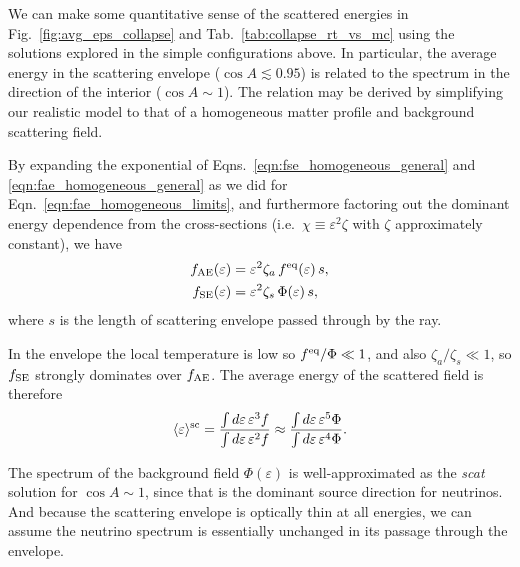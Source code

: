 \documentclass[aps,floatfix,prd,superscriptaddress,twocolumn]{revtex4-1}
\newcommand{\todo}[1]{\marginpar{\tiny{\textcolor{red}{#1}}}}
\renewcommand\todo[1]{} %
\begin{document}
We can make some quantitative sense of the scattered energies in
Fig.~\ref{fig:avg_eps_collapse} and Tab.~\ref{tab:collapse_rt_vs_mc}
using the solutions explored in the simple configurations above.
In particular, the average energy in the scattering envelope
($\cos A\lesssim 0.95$) is related to the spectrum in the direction
of the interior ($\cos A \sim 1$).
The relation may be derived by simplifying our realistic model
to that of a homogeneous matter profile and background scattering field.

By expanding the exponential of
Eqns.~\ref{eqn:fse_homogeneous_general} and \ref{eqn:fae_homogeneous_general}
as we did for Eqn.~\ref{eqn:fae_homogeneous_limits},
and furthermore factoring out the dominant energy dependence from the
cross-sections (i.e.\ $\chi\equiv\varepsilon^2 \zeta$
with $\zeta$ approximately constant), we have
\begin{align}
  \label{eqn:fae_homogeneous_thin_limit}
  f_{\rm AE}(\varepsilon)
  &= \varepsilon^2 \zeta_a \,f^{\rm eq}(\varepsilon)\,s, \\
  \label{eqn:fse_homogeneous_thin_limit}
  f_{\rm SE}(\varepsilon)
  &= \varepsilon^2 \zeta_s \,\Phi(\varepsilon)\,s,
\end{align}
where $s$ is the length of scattering envelope passed through by the ray.
\todo{should be $\chi_a^*=\varepsilon\zeta_a$ for $\nu_x$}
In the envelope the local temperature is low so $f^{\rm eq}/\Phi\ll 1$,
and also $\zeta_a/\zeta_s\ll 1$,
so $f_{\rm SE}$ strongly dominates over $f_{\rm AE}$.
The average energy of the scattered field is therefore
\begin{equation}
  \label{eqn:avg_eps_sc}
  \langle \varepsilon \rangle^{\rm sc}
  = \frac{\int d\varepsilon\,\varepsilon^3 f}{\int d\varepsilon\,\varepsilon^2 f}
  \approx \frac{\int d\varepsilon\,\varepsilon^5 \Phi}{\int d\varepsilon\,\varepsilon^4 \Phi}.
\end{equation}

The spectrum of the background field $\Phi(\varepsilon)$ is well-approximated
as the \emph{scat} solution for $\cos A\sim 1$, since that is the dominant
source direction for neutrinos.
And because the scattering envelope is optically thin at all energies,
we can assume the neutrino spectrum is essentially unchanged in its passage
through the envelope.
\end{document}
